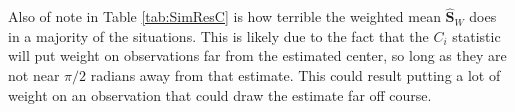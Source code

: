 \documentclass{article}\usepackage[]{graphicx}\usepackage[]{color}
\newcommand{\WeightMean}{{\widehat{\bm S}_W}}
\begin{document}
Also of note in Table \ref{tab:SimResC} is how terrible the weighted mean $\WeightMean$ does in a majority of the situations.  This is likely due to the fact that the $C_i$ statistic will put weight on observations far from the estimated center, so long as they are not near $\pi/2$ radians away from that estimate.  This could result putting a lot of weight on an observation that could draw the estimate far off course.




\clearpage
%

\end{document}
